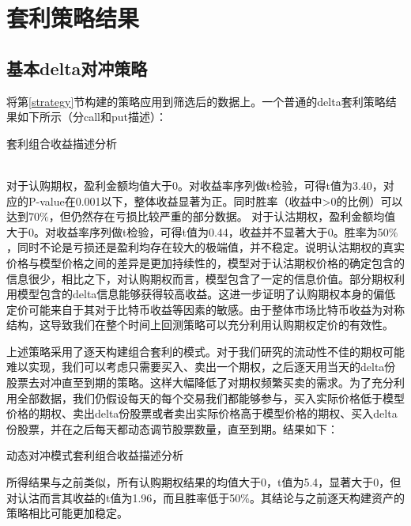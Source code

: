 \section{套利策略结果}
\subsection{基本delta对冲策略}
将第\ref{strategy}节构建的策略应用到筛选后的数据上。一个普通的delta套利策略结果如下所示（分call和put描述）： 
~\\ 
\begin{table}[H]
    \caption{套利组合收益描述分析}
    \centering
    
    
\end{table}

~\\
对于认购期权，盈利金额均值大于0。对收益率序列做t检验，可得t值为3.40，对应的P-value在0.001以下，整体收益显著为正。同时胜率（收益中>0的比例）可以达到70$\%$，但仍然存在亏损比较严重的部分数据。
对于认沽期权，盈利金额均值大于0。对收益率序列做t检验，可得t值为0.44，收益并不显著大于0。胜率为50$\%$，同时不论是亏损还是盈利均存在较大的极端值，并不稳定。说明认沽期权的真实价格与模型价格之间的差异是更加持续性的，模型对于认沽期权价格的确定包含的信息很少，相比之下，对认购期权而言，模型包含了一定的信息价值。部分期权利用模型包含的delta信息能够获得较高收益。这进一步证明了认购期权本身的偏低定价可能来自于其对于比特币收益等因素的敏感。由于整体市场比特币收益为对称结构，这导致我们在整个时间上回测策略可以充分利用认购期权定价的有效性。
\par{上述策略采用了逐天构建组合套利的模式。对于我们研究的流动性不佳的期权可能难以实现，我们可以考虑只需要买入、卖出一个期权，之后逐天用当天的delta份股票去对冲直至到期的策略。这样大幅降低了对期权频繁买卖的需求。为了充分利用全部数据，我们仍假设每天的每个交易我们都能够参与，买入实际价格低于模型价格的期权、卖出delta份股票或者卖出实际价格高于模型价格的期权、买入delta份股票，并在之后每天都动态调节股票数量，直至到期。结果如下：
}
\begin{table}[H]
    \caption{动态对冲模式套利组合收益描述分析}
    \centering
    

\end{table}
所得结果与之前类似，所有认购期权结果的均值大于0，t值为5.4，显著大于0，但对认沽而言其收益的t值为1.96，而且胜率低于50$\%$。其结论与之前逐天构建资产的策略相比可能更加稳定。

